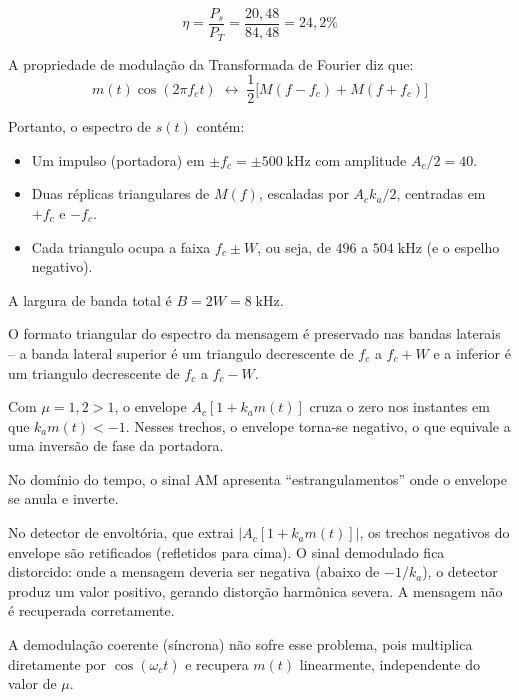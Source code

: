 \documentclass[11pt,a4paper]{article}
\begin{document}
\begin{resolucao}

\[
  \eta = \frac{P_s}{P_T} = \frac{20{,}48}{84{,}48} = \boxed{24{,}2\%}
\]
\end{resolucao}

\begin{resolucao}

A propriedade de modulação da Transformada de Fourier diz que:
\[
  m(t)\cos(2\pi f_c t) \;\longleftrightarrow\; \frac{1}{2}\big[M(f - f_c) + M(f + f_c)\big]
\]

Portanto, o espectro de $s(t)$ contém:
\begin{itemize}
  \item Um impulso (portadora) em $\pm f_c = \pm 500\;\text{kHz}$ com amplitude $A_c/2 = 40$.
  \item Duas réplicas triangulares de $M(f)$, escaladas por $A_c k_a / 2$, centradas em $+f_c$ e $-f_c$.
  \item Cada triangulo ocupa a faixa $f_c \pm W$, ou seja, de $496$ a $504\;\text{kHz}$ (e o espelho negativo).
\end{itemize}

A largura de banda total é $B = 2W = 8\;\text{kHz}$.

O formato triangular do espectro da mensagem é preservado nas bandas laterais -- a banda lateral superior é um triangulo decrescente de $f_c$ a $f_c + W$ e a inferior é um triangulo decrescente de $f_c$ a $f_c - W$.
\end{resolucao}

\begin{resolucao}[Item d -- Sobremodulação $\mu = 1{,}2$ (0{,}5 pt)]

Com $\mu = 1{,}2 > 1$, o envelope $A_c[1 + k_a m(t)]$ cruza o zero nos instantes em que $k_a m(t) < -1$. Nesses trechos, o envelope torna-se negativo, o que equivale a uma inversão de fase da portadora.

No domínio do tempo, o sinal AM apresenta ``estrangulamentos'' onde o envelope se anula e inverte.

No detector de envoltória, que extrai $|A_c[1 + k_a m(t)]|$, os trechos negativos do envelope são retificados (refletidos para cima). O sinal demodulado fica distorcido: onde a mensagem deveria ser negativa (abaixo de $-1/k_a$), o detector produz um valor positivo, gerando distorção harmônica severa. A mensagem não é recuperada corretamente.

A demodulação coerente (síncrona) não sofre esse problema, pois multiplica diretamente por $\cos(\omega_c t)$ e recupera $m(t)$ linearmente, independente do valor de $\mu$.
\end{resolucao}
\end{document}
